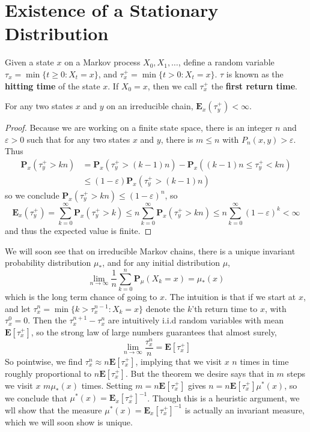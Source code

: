 \section{Existence of a Stationary Distribution}

Given a state $x$ on a Markov process $X_0, X_1, \dots$, define a random variable $\tau_x = \min \{ t \geq 0: X_t = x \}$, and $\tau_x^+ = \min \{ t > 0 : X_t = x \}$. $\tau$ is known as the {\bf hitting time} of the state $x$. If $X_0 = x$, then we call $\tau_x^+$ the {\bf first return time}.

\begin{lemma}
    For any two states $x$ and $y$ on an irreducible chain, $\mathbf{E}_x(\tau_y^+) < \infty$.
\end{lemma}
\begin{proof}
    Because we are working on a finite state space, there is an integer $n$ and $\varepsilon > 0$ such that for any two states $x$ and $y$, there is $m \leq n$ with $P_n(x,y) > \varepsilon$. Thus
    \begin{align*}
        \mathbf{P}_x(\tau_y^+ > kn) &= \mathbf{P}_x(\tau_y^+ > (k-1)n) - \mathbf{P}_x((k-1)n \leq \tau_y^+ < kn)\\
        &\leq (1 - \varepsilon) \mathbf{P}_x(\tau_y^+ > (k-1)n)
    \end{align*}
    so we conclude $\mathbf{P}_x(\tau_y^+ > kn) \leq (1 - \varepsilon)^n$, so
    \[ \mathbf{E}_x(\tau_y^+) = \sum_{k = 0}^\infty \mathbf{P}_x(\tau_y^+ > k) \leq n \sum_{k = 0}^\infty \mathbf{P}_x(\tau_y^+ > kn) \leq n \sum_{k = 0}^\infty (1 - \varepsilon)^k < \infty \]
    and thus the expected value is finite.
\end{proof}

We will soon see that on irreducible Markov chains, there is a unique invariant probability distribution $\mu_*$, and for any initial distribution $\mu$,
%
\[ \lim_{n \to \infty} \frac{1}{n} \sum_{k = 0}^n \mathbf{P}_\mu(X_k = x) = \mu_*(x) \]
%
which is the long term chance of going to $x$. The intuition is that if we start at $x$, and let $\tau_x^n = \min \{ k > \tau_x^{n-1} : X_k = x \}$ denote the $k$'th return time to $x$, with $\tau_x^0 = 0$. Then the $\tau_x^{n+1} - \tau_x^n$ are intuitively i.i.d random variables with mean $\mathbf{E}[\tau_x^+]$, so the strong law of large numbers guarantees that almost surely,
%
\[ \lim_{n \to \infty} \frac{\tau_x^n}{n} = \mathbf{E}[\tau_x^+] \]
%
So pointwise, we find $\tau_x^n \approx n \mathbf{E}[\tau_x^+]$, implying that we visit $x$ $n$ times in time roughly proportional to $n \mathbf{E}[\tau_x^+]$. But the theorem we desire says that in $m$ steps we visit $x$ $m \mu_*(x)$ times. Setting $m = n \mathbf{E}[\tau_x^+]$ gives $n = n\mathbf{E}[\tau_x^+]\mu^*(x)$, so we conclude that $\mu^*(x) = \mathbf{E}_x[\tau_x^+]^{-1}$. Though this is a heuristic argument, we wll show that the measure $\mu^*(x) = \mathbf{E}_x[\tau_x^+]^{-1}$ is actually an invariant measure, which we will soon show is unique.

